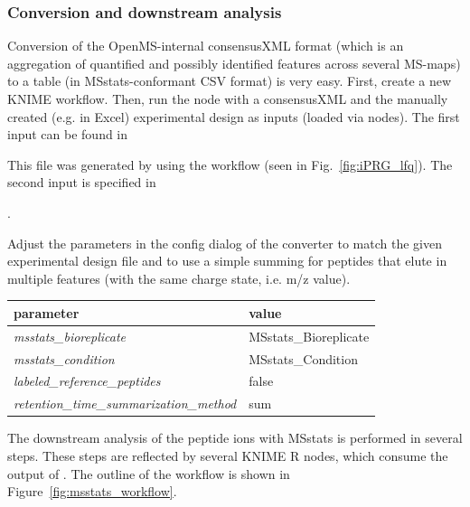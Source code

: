 \subsubsection{Conversion and downstream analysis}
\label{sec:MSstatsConversion}

Conversion of the OpenMS-internal consensusXML format (which is an aggregation of quantified and possibly identified features across several MS-maps) to a table (in MSstats-conformant CSV format) is very easy. First, create a new KNIME workflow. Then, run the  node with a consensusXML and the manually created (e.g. in Excel) experimental design as inputs (loaded via  nodes). The first input can be found in
\begin{center}
\end{center}
 This file was generated by using the  workflow (seen in Fig.~\ref{fig:iPRG_lfq}).  The second input is specified in
 \begin{center}
 .	
 \end{center}
Adjust the parameters in the config dialog of the converter to match the given experimental design file and to use a simple summing for peptides that elute in multiple features (with the same charge state, i.e. m/z value).

\begin{center}
	\begin{tabular}{ll}
		\toprule
		\textbf{parameter} & \textbf{value} \\ 
		\midrule
		\textit{msstats\_bioreplicate} & MSstats\_Bioreplicate \\
		\textit{msstats\_condition} & MSstats\_Condition \\
		\textit{labeled\_reference\_peptides} & false \\
		\textit{retention\_time\_summarization\_method} & sum\\
		\bottomrule
	\end{tabular}
\end{center}

\noindent The downstream analysis of the peptide ions with MSstats is performed in several
steps. These steps are reflected by several KNIME R nodes, which consume
the output of . The outline of the workflow is shown in Figure~\ref{fig:msstats_workflow}.

